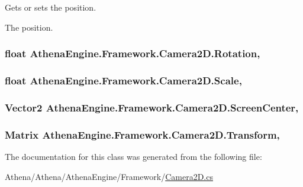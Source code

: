 Gets or sets the position. 

The position. \hypertarget{class_athena_engine_1_1_framework_1_1_camera2_d_a63df0638761ca57e15812d6ca118236a}{
\subsubsection[{Rotation}]{\setlength{\rightskip}{0pt plus 5cm}float Athena\-Engine.\-Framework.\-Camera2\-D.\-Rotation\hspace{0.3cm}{\ttfamily [get]}, {\ttfamily [set]}}}\label{class_athena_engine_1_1_framework_1_1_camera2_d_a63df0638761ca57e15812d6ca118236a}
\hypertarget{class_athena_engine_1_1_framework_1_1_camera2_d_a253bc4fde9f95baeedc7e18b5633f62f}{
\subsubsection[{Scale}]{\setlength{\rightskip}{0pt plus 5cm}float Athena\-Engine.\-Framework.\-Camera2\-D.\-Scale\hspace{0.3cm}{\ttfamily [get]}, {\ttfamily [set]}}}\label{class_athena_engine_1_1_framework_1_1_camera2_d_a253bc4fde9f95baeedc7e18b5633f62f}
\hypertarget{class_athena_engine_1_1_framework_1_1_camera2_d_a9ee30e517de34f7fb5d3675d28f2c9ce}{
\subsubsection[{Screen\-Center}]{\setlength{\rightskip}{0pt plus 5cm}Vector2 Athena\-Engine.\-Framework.\-Camera2\-D.\-Screen\-Center\hspace{0.3cm}{\ttfamily [get]}, {\ttfamily [set]}}}\label{class_athena_engine_1_1_framework_1_1_camera2_d_a9ee30e517de34f7fb5d3675d28f2c9ce}
\hypertarget{class_athena_engine_1_1_framework_1_1_camera2_d_a8cd757e58b30a4c4d57778ff2d1a79f2}{
\subsubsection[{Transform}]{\setlength{\rightskip}{0pt plus 5cm}Matrix Athena\-Engine.\-Framework.\-Camera2\-D.\-Transform\hspace{0.3cm}{\ttfamily [get]}, {\ttfamily [set]}}}\label{class_athena_engine_1_1_framework_1_1_camera2_d_a8cd757e58b30a4c4d57778ff2d1a79f2}


The documentation for this class was generated from the following file\-:\begin{DoxyCompactItemize}
\item 
Athena/\-Athena/\-Athena\-Engine/\-Framework/\hyperlink{_camera2_d_8cs}{Camera2\-D.\-cs}\end{DoxyCompactItemize}

